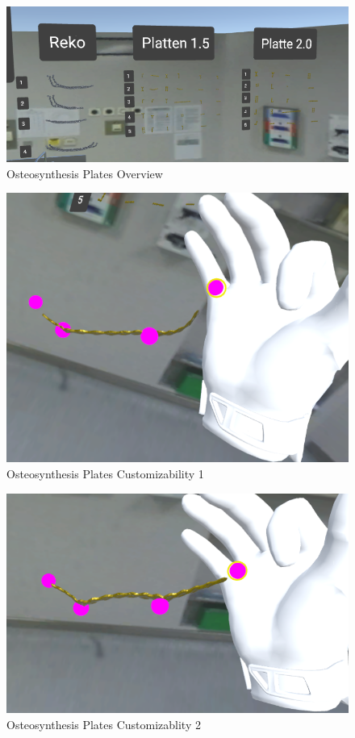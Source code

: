 \begin{figure}[ht!]
    \centering
    \includegraphics[width=\linewidth]{images/implementation/features/procedures/metal_plates_1.png}
    \caption{\label{fig::FeatureMetalPlate} Osteosynthesis Plates Overview}
\end{figure}

\begin{figure}[ht!]
    \centering
    \includegraphics[width=\linewidth]{images/implementation/features/procedures/metal_plates_2.png}
    \caption{\label{fig::FeatureMetalPlate} Osteosynthesis Plates Customizability 1}
\end{figure}

\begin{figure}[ht!]
    \centering
    \includegraphics[width=\linewidth]{images/implementation/features/procedures/metal_plates_3.png}
    \caption{\label{fig::FeatureMetalPlate} Osteosynthesis Plates Customizablity 2}
\end{figure}